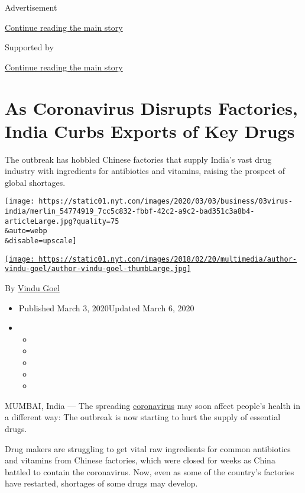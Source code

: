 Advertisement

\protect\hyperlink{after-top}{Continue reading the main story}

Supported by

\protect\hyperlink{after-sponsor}{Continue reading the main story}

\hypertarget{as-coronavirus-disrupts-factories-india-curbs-exports-of-key-drugs}{%
\section{As Coronavirus Disrupts Factories, India Curbs Exports of Key
Drugs}\label{as-coronavirus-disrupts-factories-india-curbs-exports-of-key-drugs}}

The outbreak has hobbled Chinese factories that supply India's vast drug
industry with ingredients for antibiotics and vitamins, raising the
prospect of global shortages.

\texttt{[image: https://static01.nyt.com/images/2020/03/03/business/03virus-india/merlin\_54774919\_7cc5c832-fbbf-42c2-a9c2-bad351c3a8b4-articleLarge.jpg?quality=75\\\&auto=webp\\\&disable=upscale]}

\href{https://www.nytimes.com/by/vindu-goel}{\texttt{[image: https://static01.nyt.com/images/2018/02/20/multimedia/author-vindu-goel/author-vindu-goel-thumbLarge.jpg]}}

By \href{https://www.nytimes.com/by/vindu-goel}{Vindu Goel}

\begin{itemize}
\item
  Published March 3, 2020Updated March 6, 2020
\item
  \begin{itemize}
  \item
  \item
  \item
  \item
  \item
  \end{itemize}
\end{itemize}

MUMBAI, India --- The spreading
\href{https://www.nytimes.com/news-event/coronavirus}{coronavirus} may
soon affect people's health in a different way: The outbreak is now
starting to hurt the supply of essential drugs.

Drug makers are struggling to get vital raw ingredients for common
antibiotics and vitamins from Chinese factories, which were closed for
weeks as China battled to contain the coronavirus. Now, even as some of
the country's factories have restarted, shortages of some drugs may
develop.

